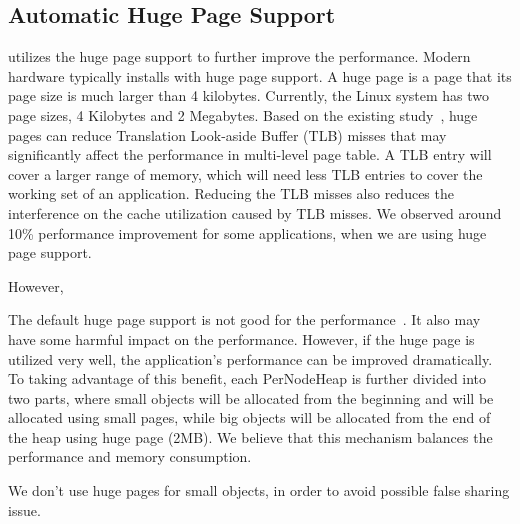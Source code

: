 \subsection{Automatic Huge Page Support} 

\NA{} utilizes the huge page support to further improve the performance. Modern hardware typically installs with huge page support. A huge page is a page that its page size is much larger than 4 kilobytes. Currently, the Linux system has two page sizes, 4 Kilobytes and 2 Megabytes. Based on the existing study~\cite{hugepages}, huge pages can reduce Translation Look-aside Buffer (TLB) misses that may significantly affect the performance in multi-level page table. A TLB entry will cover a larger range of memory, which will need less TLB entries to cover the working set of an application. Reducing the TLB misses also reduces the interference on the cache utilization caused by TLB misses. We observed around 10\% performance improvement for some applications, when we are using huge page support. 

However,  

The default huge page support is not good for the performance~\cite{}. It also may have some harmful impact on the performance. However, if the huge page is utilized very well, the application's performance can be improved dramatically. To taking advantage of this benefit, each PerNodeHeap is further divided into two parts, where small objects will be allocated from the beginning and will be allocated using small pages, while big objects will be allocated from the end of the heap using huge page (2MB). We believe that this mechanism balances the performance and memory consumption.   

We don't use huge pages for small objects, in order to avoid possible false sharing issue. 


